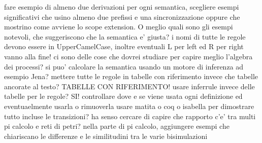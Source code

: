 fare esempio di almeno due derivazioni per ogni semantica, scegliere esempi significativi che usino almeno due prefissi e una sincronizzazione oppure che mostrino come avviene lo scope extension.
O meglio quali sono gli esempi notevoli, che suggeriscono che la semantica e' giusta?
i nomi di tutte le regole devono essere in UpperCamelCase, inoltre eventuali L per left ed R per right vanno alla fine!
ci sono delle cose che dovrei studiare per capire meglio l'algebra dei processi?
si puo' calcolare la semantica usando un motore di inferenza ad esempio Jena?
mettere tutte le regole in tabelle con riferimento invece che tabelle ancorate al testo? TABELLE CON RIFERIMENTO!
usare inferrule invece delle tabelle per le regole? SI!
controllare dove e se viene usata ogni definizione ed eventuaelmente usarla o rimuoverla
usare matita o coq o isabella per dimostrare tutto incluse le transizioni?
ha senso cercare di capire che rapporto c'e' tra multi pi calcolo e reti di petri?
nella parte di pi calcolo, aggiungere esempi che chiariscano le differenze e le similitudini tra le varie bisimulazioni




